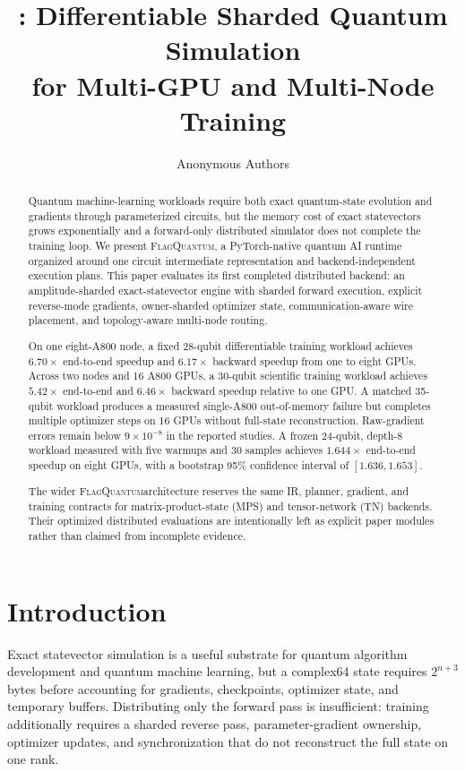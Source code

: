 \documentclass[10pt,twocolumn]{article}
\title{\system: Differentiable Sharded Quantum Simulation\\
for Multi-GPU and Multi-Node Training}
\author{Anonymous Authors}
\date{}
\newcommand{\system}{\textsc{FlagQuantum}}
\begin{document}
\maketitle

\begin{abstract}
Quantum machine-learning workloads require both exact quantum-state evolution
and gradients through parameterized circuits, but the memory cost of exact
statevectors grows exponentially and a forward-only distributed simulator does
not complete the training loop.  We present \system, a PyTorch-native quantum
AI runtime organized around one circuit intermediate representation and
backend-independent execution plans.  This paper evaluates its first completed
distributed backend: an amplitude-sharded exact-statevector engine with
sharded forward execution, explicit reverse-mode gradients, owner-sharded
optimizer state, communication-aware wire placement, and topology-aware
multi-node routing.

On one eight-A800 node, a fixed 28-qubit differentiable training workload
achieves \(6.70\times\) end-to-end speedup and \(6.17\times\) backward speedup
from one to eight GPUs.  Across two nodes and 16 A800 GPUs, a 30-qubit
scientific training workload achieves \(5.42\times\) end-to-end and
\(6.46\times\) backward speedup relative to one GPU.  A matched 35-qubit
workload produces a measured single-A800 out-of-memory failure but completes
multiple optimizer steps on 16 GPUs without full-state reconstruction.
Raw-gradient errors remain below \(9\times10^{-8}\) in the reported studies.
A frozen 24-qubit, depth-8 workload measured with five warmups and 30 samples
achieves \(1.644\times\) end-to-end speedup on eight GPUs, with a bootstrap
95\% confidence interval of \([1.636,1.653]\).

The wider \system architecture reserves the same IR, planner, gradient, and
training contracts for matrix-product-state (MPS) and tensor-network (TN)
backends.  Their optimized distributed evaluations are intentionally left as
explicit paper modules rather than claimed from incomplete evidence.
\end{abstract}

\section{Introduction}

Exact statevector simulation is a useful substrate for quantum algorithm
development and quantum machine learning, but a complex64 state requires
\(2^{n+3}\) bytes before accounting for gradients, checkpoints, optimizer
state, and temporary buffers.  Distributing only the forward pass is
insufficient: training additionally requires a sharded reverse pass,
parameter-gradient ownership, optimizer updates, and synchronization that do
not reconstruct the full state on one rank.
\end{document}
